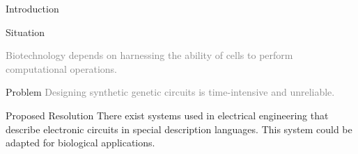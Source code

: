 \documentclass[10pt]{beamer}
\newcommand{\light}[1]{\textcolor{gray}{#1}}
\begin{document}
\begin{frame}[fragile]{Introduction}

    {
    
      \begin{block}{Situation}
      
        \light{Biotechnology depends on harnessing the ability of cells to perform computational operations. }
      \end{block}
      \begin{block}{Problem}
        \light{Designing synthetic genetic circuits is time-intensive and unreliable.}
      \end{block}
      \begin{exampleblock}{Proposed Resolution}
        There exist systems used in electrical engineering that describe electronic circuits in special description languages. This system could be adapted for biological applications.
      \end{exampleblock}}
      
\end{frame}

\begin{frame}{Technology}

\vspace{0.5cm}
\begin{figure}
    \centering
    }%
\end{figure}

\nocite{Brophy2014PrinciplesDesign} 
\end{frame}
\end{document}
